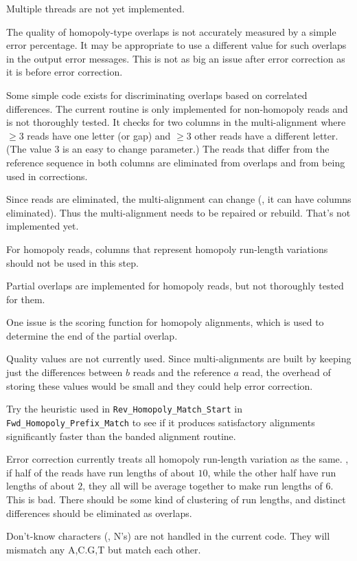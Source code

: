 \documentclass[letterpaper,11pt]{article}
\def\Pgm#1{\texttt{#1}}
\newenvironment{technotes}{\bq\small\bf\bi\exdent{Technical Notes:}}{\ei\eq}
\def\btn{\begin{technotes}}
\def\etn{\end{technotes}}
\begin{document}
\bn
\item
  Multiple threads are not yet implemented.
\item
  The quality of homopoly-type overlaps is not accurately measured
  by a simple error percentage.  It may be appropriate to use a
  different value for such overlaps in the output error messages.
  This is not as big an issue after error correction as it is before
  error correction.
\item
  Some simple code exists for discriminating overlaps based on
  correlated differences.  The current routine is only implemented for
  non-homopoly reads and is not thoroughly tested.  It checks for
  two columns in the multi-alignment where $\ge 3$ reads have one
  letter (or gap) and $\ge 3$ other reads have a different letter.
  (The value $3$ is an easy to change parameter.)  The reads that differ
  from the reference sequence in both columns are eliminated from
  overlaps and from being used in corrections.
  \btn
  \item
    Since reads are eliminated, the multi-alignment can change (\eg,
    it can have columns eliminated).  Thus the multi-alignment needs
    to be repaired or rebuild.  That's not implemented yet.
  \item
    For homopoly reads, columns that represent homopoly run-length
    variations should not be used in this step.
  \etn
\item
  Partial overlaps are implemented for homopoly reads, but not
  thoroughly tested for them.
  \btn
  \item
    One issue is the scoring function for homopoly alignments, which
    is used to determine the end of the partial overlap.
  \etn
\item
  Quality values are not currently used.  Since multi-alignments are built
  by keeping just the differences between $b$ reads and the reference
  $a$ read, the overhead of storing these values would be small and
  they could help error correction.
\item
  Try the heuristic used in \Pgm{Rev\_Homopoly\_Match\_Start} in
  \Pgm{Fwd\_Homopoly\_Prefix\_Match} to see if it produces satisfactory
  alignments significantly faster than the banded alignment routine.
\item
  Error correction currently treats all homopoly run-length variation
  as the same.  \Eg, if half of the reads have run lengths of about $10$,
  while the other half have run lengths of about $2$, they all will be
  average together to make run lengths of $6$.  This is bad.  There should
  be some kind of clustering of run lengths, and distinct differences
  should be eliminated as overlaps.
\item
  Don't-know characters (\ie, N's) are not handled in the current code.
  They will mismatch any A,C.G,T but match each other.
\en
\end{document}
